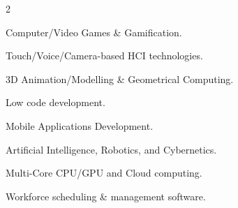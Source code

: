 

\begin{cventries}


  \cventry
    {} 
    {}
    {}
    {}
    {    	
	  \vspace{-1.7cm}
      \begin{multicols}{2}
      \begin{cvitems}
		\item {Computer/Video Games \& \textcolor{awesome-emerald}{Gamification}.}      
        \item {Touch/Voice/Camera-based HCI technologies.}
        \item {3D Animation/Modelling \& Geometrical Computing.}
        \item {\textcolor{awesome-emerald}{Low code development}.}
        \item {Mobile Applications Development.}
        \item {\textcolor{awesome-emerald}{Artificial Intelligence, Robotics, and Cybernetics}.}
        \item {Multi-Core CPU/GPU and Cloud computing.}
        \item {Workforce scheduling \& management software.}
      \end{cvitems}
	  \end{multicols}
	  \vspace{-0.5cm}
    }

\end{cventries}
